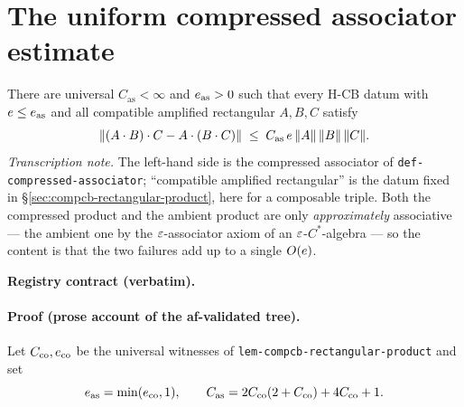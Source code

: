 \section{The uniform compressed associator estimate}\label{sec:hcb0-compressed-associator}

\begin{lemma}\label{lem:hcb0-compressed-associator}
There are universal $C_{\mathrm{as}}<\infty$ and $e_{\mathrm{as}}>0$ such that every
H-CB datum with $e\le e_{\mathrm{as}}$ and all compatible amplified rectangular
$A,B,C$ satisfy
\begin{equation}\label{eq:as-main}
  \lVert (A\mathbin{\cdot} B)\mathbin{\cdot} C-A\mathbin{\cdot}(B\mathbin{\cdot} C)\rVert\;\le\;C_{\mathrm{as}}\,e\,\lVert A\rVert\,\lVert B\rVert\,\lVert C\rVert.
\end{equation}
\emph{Transcription note.} The left-hand side is the compressed associator of
\texttt{def-compressed-associator}; ``compatible amplified rectangular'' is the datum
fixed in \S\ref{sec:compcb-rectangular-product}, here for a composable triple. Both the
compressed product and the ambient product are only \emph{approximately} associative --- the
ambient one by the $\varepsilon$-associator axiom of an $\varepsilon$-$C^*$-algebra --- so the content
is that the two failures add up to a single $O(e)$.
\end{lemma}

\noindent\textbf{Registry contract (verbatim).}

\paragraph{Proof (prose account of the af-validated tree).}
Let $C_{\mathrm{co}},e_{\mathrm{co}}$ be the universal witnesses of
\texttt{lem-compcb-rectangular-product} and set
\[
  e_{\mathrm{as}}=\min(e_{\mathrm{co}},1),
  \qquad
  C_{\mathrm{as}}=2C_{\mathrm{co}}(2+C_{\mathrm{co}})+4C_{\mathrm{co}}+1 .
\]

